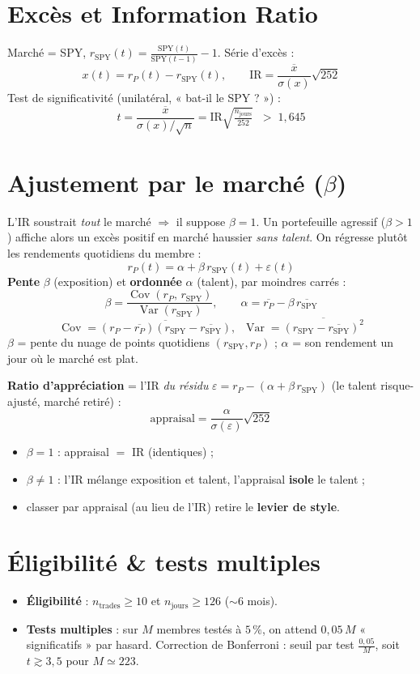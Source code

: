 \documentclass[10pt,a4paper,twocolumn]{article}
\begin{document}
\section{Excès et Information Ratio}
Marché = SPY, $r_{\text{SPY}}(t)=\tfrac{\text{SPY}(t)}{\text{SPY}(t-1)}-1$. Série d'excès :
$$x(t)=r_P(t)-r_{\text{SPY}}(t),\qquad
  \mathrm{IR}=\frac{\overline{x}}{\sigma(x)}\sqrt{252}$$
Test de significativité (unilatéral, « bat-il le SPY ? ») :
$$t=\frac{\overline{x}}{\sigma(x)/\sqrt{n}}=\mathrm{IR}\sqrt{\tfrac{n_{\text{jours}}}{252}}\;\;>\;1{,}645$$

\section{Ajustement par le marché (\texorpdfstring{$\beta$}{beta})}\label{sec:beta}
L'IR soustrait \emph{tout} le marché $\Rightarrow$ il suppose $\beta=1$. Un portefeuille agressif
($\beta>1$) affiche alors un excès positif en marché haussier \emph{sans talent}. On régresse plutôt
les rendements quotidiens du membre :
$$r_P(t)=\alpha+\beta\,r_{\text{SPY}}(t)+\varepsilon(t)$$
\textbf{Pente} $\beta$ (exposition) et \textbf{ordonnée} $\alpha$ (talent), par moindres carrés :
$$\beta=\frac{\operatorname{Cov}(r_P,\,r_{\text{SPY}})}{\operatorname{Var}(r_{\text{SPY}})},\qquad
  \alpha=\overline{r_P}-\beta\,\overline{r_{\text{SPY}}}$$
$$\operatorname{Cov}=\overline{(r_P-\overline{r_P})(r_{\text{SPY}}-\overline{r_{\text{SPY}}})},\;\;
  \operatorname{Var}=\overline{(r_{\text{SPY}}-\overline{r_{\text{SPY}}})^2}$$
$\beta$ = pente du nuage de points quotidiens $(r_{\text{SPY}},r_P)$ ; $\alpha$ = son rendement un jour où
le marché est plat.

\textbf{Ratio d'appréciation} = l'IR \emph{du résidu} $\varepsilon=r_P-(\alpha+\beta\,r_{\text{SPY}})$
(le talent risque-ajusté, marché retiré) :
$$\text{appraisal}=\frac{\alpha}{\sigma(\varepsilon)}\sqrt{252}$$
\begin{itemize}
  \item $\beta=1$ : appraisal $=$ IR (identiques) ;
  \item $\beta\neq1$ : l'IR mélange exposition et talent, l'appraisal \textbf{isole} le talent ;
  \item classer par appraisal (au lieu de l'IR) retire le \textbf{levier de style}.
\end{itemize}

\section{Éligibilité \& tests multiples}
\begin{itemize}
  \item \textbf{Éligibilité} : $n_{\text{trades}}\ge 10$ et $n_{\text{jours}}\ge 126$ ($\sim$6 mois).
  \item \textbf{Tests multiples} : sur $M$ membres testés à $5\,\%$, on attend $0{,}05\,M$ « significatifs »
        par hasard. Correction de Bonferroni : seuil par test $\tfrac{0{,}05}{M}$, soit
        $t \gtrsim 3{,}5$ pour $M\simeq 223$.
\end{itemize}
\end{document}

